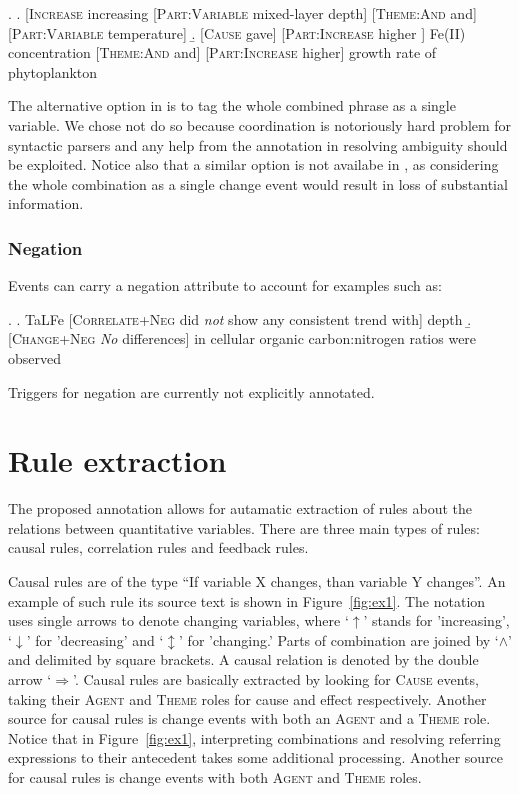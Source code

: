 \documentclass[10pt, a4paper]{article}
\newcommand{\tag}[1]{\textsc{#1}}
\begin{document}
\exi.
  \a. [\tag{Increase} increasing [\tag{Part:Variable} mixed-layer depth] [\tag{Theme:And} and] [\tag{Part:Variable} temperature]  
  \b. [\tag{Cause} gave] [\tag{Part:Increase} higher ] Fe(II) concentration [\tag{Theme:And} and] [\tag{Part:Increase} higher] growth rate of phytoplankton

The alternative option in \Last[a] is to tag the whole combined phrase as a single variable.
We chose not do so because coordination is notoriously hard problem for syntactic parsers and any help from the annotation in resolving ambiguity should be exploited.
Notice also that a similar option is not availabe in \Last[b], as considering the whole combination as a single change event would result in loss of substantial information.


\subsubsection{Negation}

Events can carry a negation attribute to account for examples such as:

\exi.
  \a. TaLFe [\tag{Correlate+Neg} did \emph{not} show any consistent trend with] depth 
  \b. [\tag{Change+Neg} \emph{No} differences] in cellular organic carbon:nitrogen ratios were observed

Triggers for negation are currently not explicitly annotated.


\section{Rule extraction}
\label{sec:extraction}

The proposed annotation allows for autamatic extraction of rules about the relations between quantitative variables.
There are three main types of rules: causal rules, correlation rules and feedback rules.

Causal rules are of the type ``If variable X changes, than variable Y changes''.
An example of such rule its source text is shown in Figure~\ref{fig:ex1}.
The notation uses single arrows to denote changing variables, where `$\uparrow$' stands for 'increasing', `$\downarrow$' for 'decreasing' and `$\updownarrow$' for 'changing.'
Parts of combination are joined by `$\wedge$' and delimited by square brackets.
A causal relation is denoted by the double arrow `$\Longrightarrow$'.
Causal rules are basically extracted by looking for \tag{Cause} events, taking their \tag{Agent} and \tag{Theme} roles for cause and effect respectively.
Another source for causal rules is change events with both an \tag{Agent} and a \tag{Theme} role.
Notice that in Figure~\ref{fig:ex1}, interpreting combinations and resolving referring expressions to their antecedent takes some additional processing.
Another source for causal rules is change events with both \tag{Agent} and \tag{Theme} roles.
\end{document}
